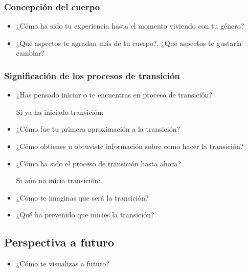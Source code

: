 \subsubsection{Concepción del cuerpo}

\begin{itemize}
\item
  ¿Cómo ha sido tu experiencia hasta el momento viviendo con tu género?
\item
  ¿Qué aspectos te agradan más de tu cuerpo?, ¿Qué aspectos te gustaría
  cambiar?
\end{itemize}

\subsubsection{Significación de los procesos de transición}

\begin{itemize}
\item
  ¿Has pensado iniciar o te encuentras en proceso de transición?

Si ya ha iniciado transición:

\item
  ¿Cómo fue tu primera aproximación a la transición?
\item
  ¿Cómo obtienes u obtuviste información sobre como hacer la transición?
\item
  ¿Cómo ha sido el proceso de transición hasta ahora?

Si aún no inicia transición:

\item
  ¿Cómo te imaginas que será la transición?
\item
  ¿Qué ha prevenido que inicies la transición?
\end{itemize}

\subsection{Perspectiva a futuro}

\begin{itemize}
\item
  ¿Cómo te visualizas a futuro?
\end{itemize}
